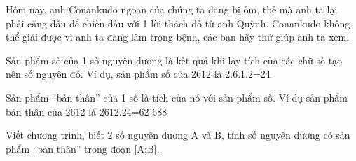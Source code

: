 Hôm nay, anh Conankudo ngoan của chúng ta đang bị ốm, thế mà anh ta lại phải căng đầu để chiến đấu với 1 lời thách đố từ anh Quỳnh. Conankudo không thể giải được vì anh ta đang lâm trọng bệnh, các bạn hãy thử giúp anh ta xem.  

   Sản phẩm số của 1 số nguyên dương là kết quả khi lấy tích của các chữ số tạo nên số nguyên đó. Ví dụ, sản phẩm số của 2612 là 2.6.1.2=24  

   Sản phẩm “bản thân” của 1 số      là tích của nó với sản phẩm số. Ví dụ sản phẩm bản thân của 2612 là 2612.24=62 688  

   Viết chương trình, biết 2 số nguyên dương A và B, tính số nguyên dương có sản phẩm “bản thân” trong đoạn [A;B].  

\
